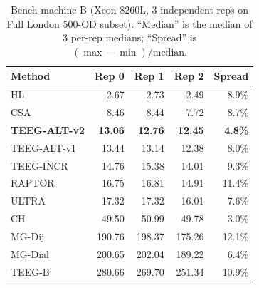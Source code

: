 \documentclass[letterpaper]{article}
\begin{document}
\begin{table}[H]
\centering
\caption{Bench machine B (Xeon 8260L, 3 independent reps on Full
London 500-OD subset). ``Median'' is the median of 3 per-rep medians;
``Spread'' is $(\max - \min) / \text{median}$.}
\label{tab:multirep}
\small
\begin{tabular}{lrrrr}
\toprule
Method & Rep 0 & Rep 1 & Rep 2 & Spread \\
\midrule
HL              &   2.67 &   2.73 &   2.49 & 8.9\% \\
CSA             &   8.46 &   8.44 &   7.72 & 8.7\% \\
\textbf{TEEG-ALT-v2}    & \textbf{13.06} & \textbf{12.76} & \textbf{12.45} & \textbf{4.8\%} \\
TEEG-ALT-v1     &  13.44 &  13.14 &  12.38 & 8.0\% \\
TEEG-INCR       &  14.76 &  15.38 &  14.01 & 9.3\% \\
RAPTOR          &  16.75 &  16.81 &  14.91 & 11.4\% \\
ULTRA           &  17.32 &  17.32 &  16.01 & 7.6\% \\
CH              &  49.50 &  50.99 &  49.78 & 3.0\% \\
MG-Dij          & 190.76 & 198.37 & 175.26 & 12.1\% \\
MG-Dial         & 200.65 & 202.04 & 189.22 & 6.4\% \\
TEEG-B          & 280.66 & 269.70 & 251.34 & 10.9\% \\
\bottomrule
\end{tabular}
\end{table}
\end{document}
